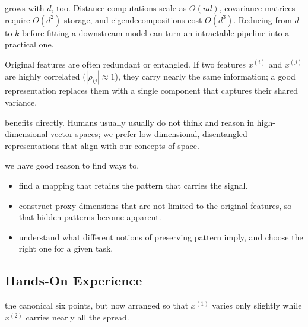  grows with $d$, too.
Distance computations scale as $O(nd)$, covariance matrices require $O(d^{2})$ storage, and 
eigendecompositions cost $O(d^{3})$.
Reducing from $d$ to $k$ before fitting a downstream model can turn an intractable pipeline into a practical one.

 Original features are often redundant or entangled.
If two features $x^{(i)}$ and $x^{(j)}$ are highly correlated ($|\rho_{ij}| \approx 1$), 
they carry nearly the same information; a good representation replaces them with a single component 
that captures their shared variance.

 benefits directly.
Humans usually usually do not think and reason in high-dimensional vector spaces; we prefer low-dimensional, 
disentangled representations that align with our concepts of space.



 we have good reason to find ways to,
\begin{itemize}
    \item find a mapping that retains the pattern that carries the signal.
    \item construct proxy dimensions that are not limited to the original features, so that hidden patterns become apparent.
    \item understand what different notions of preserving pattern imply, and choose the right one for a given task.
\end{itemize}












\newpage
\subsection{Hands-On Experience}

 the canonical six points, but now arranged so that $x^{(1)}$ varies 
only slightly while $x^{(2)}$ carries nearly all the spread.

